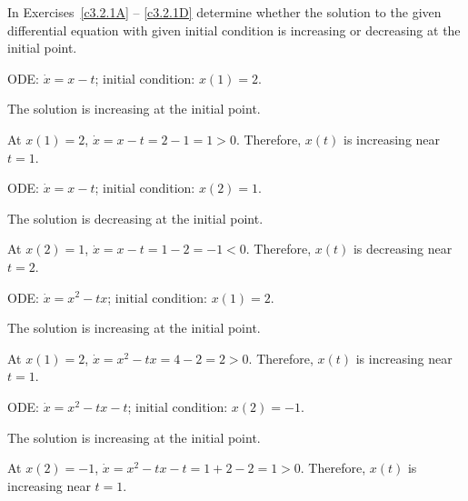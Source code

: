 \documentclass{ximera}
\begin{document}
\noindent In Exercises~\ref{c3.2.1A} -- \ref{c3.2.1D} determine whether the 
solution to the given differential equation with given initial condition is 
increasing or decreasing at the initial point.
\begin{exercise} \label{c3.2.1A}
ODE: $\dot{x}=x-t$; initial condition: $x(1)=2$.

\begin{solution}
\ans The solution is increasing at the initial point.

\soln At $x(1)=2$, $\dot{x}=x-t=2-1=1>0$.  Therefore, $x(t)$ is increasing
near $t=1$.

\end{solution}
\end{exercise}
\begin{exercise} \label{c3.2.1B}
ODE: $\dot{x}=x-t$; initial condition: $x(2)=1$.

\begin{solution}
\ans The solution is decreasing at the initial point.

\soln At $x(2)=1$, $\dot{x}=x-t=1-2=-1<0$.  Therefore, $x(t)$ is decreasing
near $t=2$.

\end{solution}
\end{exercise}
\begin{exercise} \label{c3.2.1C}
ODE: $\dot{x}=x^2-tx$; initial condition: $x(1)=2$.

\begin{solution}
\ans The solution is increasing at the initial point.

\soln At $x(1)=2$, $\dot{x}=x^2-tx=4-2=2>0$.  Therefore, $x(t)$ is increasing
near $t=1$.

\end{solution}
\end{exercise}
\begin{exercise} \label{c3.2.1D}
ODE: $\dot{x}=x^2-tx-t$; initial condition: $x(2)=-1$.

\begin{solution}
\ans The solution is increasing at the initial point.

\soln At $x(2)=-1$, $\dot{x}=x^2-tx-t=1+2-2=1>0$.  Therefore, $x(t)$ is
increasing near $t=1$.

\end{solution}
\end{exercise}
\end{document}
